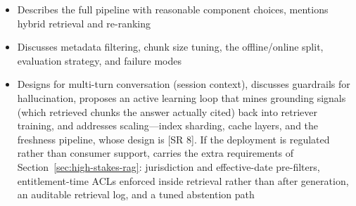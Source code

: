 \begin{interviewq}

\goodgreat
\begin{itemize}
    \item {} Describes the full pipeline with reasonable component choices,
          mentions hybrid retrieval and re-ranking
    \item {} Discusses metadata filtering, chunk size tuning, the
          offline/online split, evaluation strategy, and failure modes
    \item {} Designs for multi-turn conversation (session context),
          discusses guardrails for hallucination, proposes an active learning loop
          that mines grounding signals (which retrieved chunks the answer actually
          cited) back into retriever training, and addresses scaling---index
          sharding, cache layers, and the freshness pipeline, whose design is
          [SR 8].  If the deployment is regulated rather than consumer support,
          carries the extra requirements of Section~\ref{sec:high-stakes-rag}:
          jurisdiction and effective-date pre-filters, entitlement-time ACLs
          enforced inside retrieval rather than after generation, an auditable
          retrieval log, and a tuned abstention path
\end{itemize}

\end{interviewq}

\bigskip

